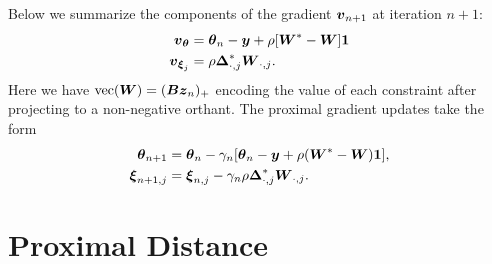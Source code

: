 \documentclass{article}
\begin{document}
Below we summarize the components of the gradient \(\boldsymbol{v}_{n+1}\) at iteration \(n+1\):
\begin{align*}
    \boldsymbol{v}_{\boldsymbol{\theta}}
    &=
    \boldsymbol{\theta}_{n} - \boldsymbol{y} + \rho [\boldsymbol{W}^{\ast} - \boldsymbol{W}] \boldsymbol{1} \\
    \boldsymbol{v}_{\boldsymbol{\xi}_{j}}
    &=
    \rho \boldsymbol{\Delta}_{\cdot,j}^{\ast} \boldsymbol{W}_{\cdot,j}.
\end{align*}
Here we have \(\mathop{\rm vec}\nolimits(\boldsymbol{W}) = (\boldsymbol{B} \boldsymbol{z}_{n})_{+}\) encoding the value of each constraint after projecting to a non-negative orthant.
The proximal gradient updates take the form
\begin{align*}
    \boldsymbol{\theta}_{n+1}
    &=
    \boldsymbol{\theta}_{n}
    - \gamma_{n} [\boldsymbol{\theta}_{n} - \boldsymbol{y} + \rho (\boldsymbol{W}^{\ast} - \boldsymbol{W}) \boldsymbol{1}], \\
    \boldsymbol{\xi}_{n+1,j}
    &=
    \boldsymbol{\xi}_{n,j} - \gamma_{n} \rho \boldsymbol{\Delta}_{\cdot,j}^{\ast} \boldsymbol{W}_{\cdot,j}.
\end{align*}

\section*{\center Proximal Distance}
\end{document}
